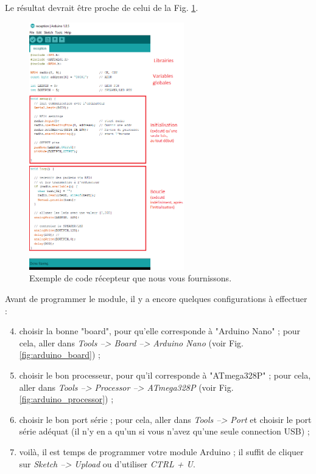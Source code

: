 \documentclass[a4paper,10pt,twoside]{article}
\begin{document}
Le résultat devrait être proche de celui de la Fig. \ref{fig:arduino_reception}.

\begin{figure}[ht!]
	\centering
	\includegraphics[width=0.6\textwidth]{imgs/arduino_reception.png}
	\caption{Exemple de code récepteur que nous vous fournissons.}
	\label{fig:arduino_reception}
\end{figure}

Avant de programmer le module, il y a encore quelques configurations à effectuer :
\begin{enumerate}
	\setcounter{enumi}{3}
	\item choisir la bonne "board", pour qu'elle corresponde à "Arduino Nano" ; pour cela, aller dans \textit{Tools --> Board --> Arduino Nano} (voir Fig. \ref{fig:arduino_board}) ;
	\item choisir le bon processeur, pour qu'il corresponde à "ATmega328P" ; pour cela, aller dans \textit{Tools --> Processor --> ATmega328P} (voir Fig. \ref{fig:arduino_processor}) ;
	\item choisir le bon port série ; pour cela, aller dans \textit{Tools --> Port} et choisir le port série adéquat (il n'y en a qu'un si vous n'avez qu'une seule connection USB) ;
	\item voilà, il est temps de programmer votre module Arduino ; il suffit de cliquer sur \textit{Sketch --> Upload} ou d'utiliser \textit{CTRL + U}.
\end{enumerate}
\end{document}
